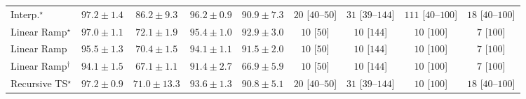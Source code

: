 \begin{tabular}{l|cccc|cccc|}
Interp.$^\star$ & {\cellcolor[HTML]{702806}} \color[HTML]{F1F1F1} $97.2\pm 1.4$ & {\cellcolor[HTML]{CF5004}} \color[HTML]{F1F1F1} $86.2\pm 9.3$ & {\cellcolor[HTML]{792B05}} \color[HTML]{F1F1F1} $96.2\pm 0.9$ & {\cellcolor[HTML]{A83B03}} \color[HTML]{F1F1F1} $90.9\pm 7.3$ & {\cellcolor[HTML]{FFF3EF}} \color[HTML]{000000} $20$ [$40$--$50$] & {\cellcolor[HTML]{FEF1ED}} \color[HTML]{000000} $31$ [$39$--$144$] & {\cellcolor[HTML]{FDDDD9}} \color[HTML]{000000} $111$ [$40$--$100$] & {\cellcolor[HTML]{FFF3F0}} \color[HTML]{000000} $18$ [$40$--$100$] \\
Linear Ramp$^\star$ & {\cellcolor[HTML]{712806}} \color[HTML]{F1F1F1} $97.0\pm 1.1$ & {\cellcolor[HTML]{FEB23F}} \color[HTML]{000000} $72.1\pm 1.9$ & {\cellcolor[HTML]{802D05}} \color[HTML]{F1F1F1} $95.4\pm 1.0$ & {\cellcolor[HTML]{963304}} \color[HTML]{F1F1F1} $92.9\pm 3.0$ & {\cellcolor[HTML]{FFF6F2}} \color[HTML]{000000} $10$ [$50$] & {\cellcolor[HTML]{FFF6F2}} \color[HTML]{000000} $10$ [$144$] & {\cellcolor[HTML]{FFF6F2}} \color[HTML]{000000} $10$ [$100$] & {\cellcolor[HTML]{FFF6F2}} \color[HTML]{000000} $7$ [$100$] \\
Linear Ramp & {\cellcolor[HTML]{802D05}} \color[HTML]{F1F1F1} $95.5\pm 1.3$ & {\cellcolor[HTML]{FEBE4A}} \color[HTML]{000000} $70.4\pm 1.5$ & {\cellcolor[HTML]{8B3005}} \color[HTML]{F1F1F1} $94.1\pm 1.1$ & {\cellcolor[HTML]{A33904}} \color[HTML]{F1F1F1} $91.5\pm 2.0$ & {\cellcolor[HTML]{FFF6F2}} \color[HTML]{000000} $10$ [$50$] & {\cellcolor[HTML]{FFF6F2}} \color[HTML]{000000} $10$ [$144$] & {\cellcolor[HTML]{FFF6F2}} \color[HTML]{000000} $10$ [$100$] & {\cellcolor[HTML]{FFF6F2}} \color[HTML]{000000} $7$ [$100$] \\
Linear Ramp$^\dagger$ & {\cellcolor[HTML]{8B3005}} \color[HTML]{F1F1F1} $94.1\pm 1.5$ & {\cellcolor[HTML]{FED26D}} \color[HTML]{000000} $67.1\pm 1.1$ & {\cellcolor[HTML]{A33904}} \color[HTML]{F1F1F1} $91.4\pm 2.7$ & {\cellcolor[HTML]{FED36F}} \color[HTML]{000000} $66.9\pm 5.9$ & {\cellcolor[HTML]{FFF6F2}} \color[HTML]{000000} $10$ [$50$] & {\cellcolor[HTML]{FFF6F2}} \color[HTML]{000000} $10$ [$144$] & {\cellcolor[HTML]{FFF6F2}} \color[HTML]{000000} $10$ [$100$] & {\cellcolor[HTML]{FFF6F2}} \color[HTML]{000000} $7$ [$100$] \\
Recursive TS$^\star$ & {\cellcolor[HTML]{702806}} \color[HTML]{F1F1F1} $97.2\pm 0.9$ & {\cellcolor[HTML]{FEBA46}} \color[HTML]{000000} $71.0\pm 13.3$ & {\cellcolor[HTML]{903104}} \color[HTML]{F1F1F1} $93.6\pm 1.3$ & {\cellcolor[HTML]{A93C03}} \color[HTML]{F1F1F1} $90.8\pm 5.1$ & {\cellcolor[HTML]{FFF3EF}} \color[HTML]{000000} $20$ [$40$--$50$] & {\cellcolor[HTML]{FEF1ED}} \color[HTML]{000000} $31$ [$39$--$144$] & {\cellcolor[HTML]{FFF6F2}} \color[HTML]{000000} $10$ [$100$] & {\cellcolor[HTML]{FFF3F0}} \color[HTML]{000000} $18$ [$40$--$100$] \\

\end{tabular}
